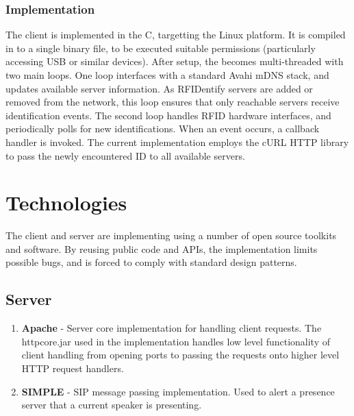 \documentclass{article}
\begin{document}
        \subsubsection{Implementation}
        The client is implemented in the C, targetting the Linux platform.  It is compiled in to a single 
        binary file, to be executed suitable permissions (particularly accessing USB or similar devices).
        After setup, the becomes multi-threaded with two main loops. One loop interfaces with a standard
        Avahi mDNS stack, and updates available server information.  As RFIDentify servers are added or 
        removed from the network, this loop ensures that only reachable servers receive identification events.
        The second loop handles RFID hardware interfaces, and periodically polls for new identifications.
        When an event occurs, a callback handler is invoked. The current implementation employs the 
        cURL HTTP library to pass the newly encountered ID to all available servers.


\section{Technologies}
	The client and server are implementing using a number of open source toolkits and software.
        By reusing public code and APIs, the implementation limits possible bugs, and is forced to comply
        with standard design patterns.

	\subsection{Server}
	
		\begin{enumerate}
		\item	\textbf { Apache } -
		Server core implementation for handling client requests. The httpcore.jar used in the implementation
		 handles low level functionality of client handling from opening ports to passing the requests onto higher level HTTP request handlers.
			
	
		\item  \textbf {SIMPLE } - 
		SIP message passing implementation. Used to alert a presence server that a current speaker is presenting.
		
		\end{enumerate}

		
\end{document}
